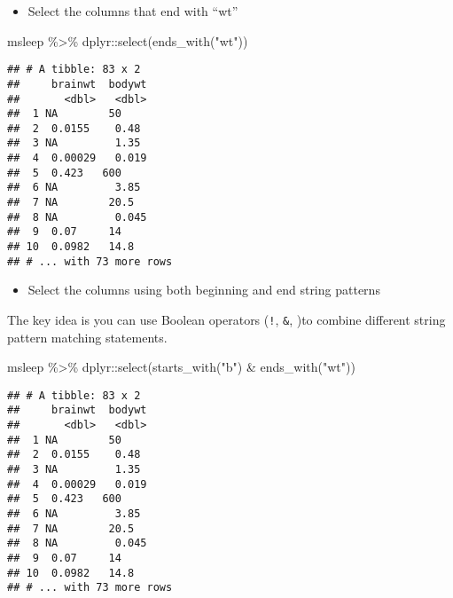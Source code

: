 \documentclass[
]{book}
\newenvironment{Shaded}{\begin{snugshade}}{\end{snugshade}}
\newcommand{\FunctionTok}[1]{\textcolor[rgb]{0.00,0.00,0.00}{#1}}
\newcommand{\NormalTok}[1]{#1}
\newcommand{\SpecialCharTok}[1]{\textcolor[rgb]{0.00,0.00,0.00}{#1}}
\newcommand{\StringTok}[1]{\textcolor[rgb]{0.31,0.60,0.02}{#1}}
\providecommand{\tightlist}{%
  \setlength{\itemsep}{0pt}\setlength{\parskip}{0pt}}
\begin{document}
\begin{itemize}
\tightlist
\item
  Select the columns that end with ``wt''
\end{itemize}

\begin{Shaded}
\begin{Highlighting}[]
\NormalTok{msleep }\SpecialCharTok{\%\textgreater{}\%}
\NormalTok{  dplyr}\SpecialCharTok{::}\FunctionTok{select}\NormalTok{(}\FunctionTok{ends\_with}\NormalTok{(}\StringTok{"wt"}\NormalTok{))}
\end{Highlighting}
\end{Shaded}

\begin{verbatim}
## # A tibble: 83 x 2
##     brainwt  bodywt
##       <dbl>   <dbl>
##  1 NA        50    
##  2  0.0155    0.48 
##  3 NA         1.35 
##  4  0.00029   0.019
##  5  0.423   600    
##  6 NA         3.85 
##  7 NA        20.5  
##  8 NA         0.045
##  9  0.07     14    
## 10  0.0982   14.8  
## # ... with 73 more rows
\end{verbatim}

\begin{itemize}
\tightlist
\item
  Select the columns using both beginning and end string patterns
\end{itemize}

The key idea is you can use Boolean operators (\texttt{!}, \texttt{\&}, \texttt{\textbar{}})to combine different string pattern matching statements.

\begin{Shaded}
\begin{Highlighting}[]
\NormalTok{msleep }\SpecialCharTok{\%\textgreater{}\%}
\NormalTok{  dplyr}\SpecialCharTok{::}\FunctionTok{select}\NormalTok{(}\FunctionTok{starts\_with}\NormalTok{(}\StringTok{"b"}\NormalTok{) }\SpecialCharTok{\&} \FunctionTok{ends\_with}\NormalTok{(}\StringTok{"wt"}\NormalTok{))}
\end{Highlighting}
\end{Shaded}

\begin{verbatim}
## # A tibble: 83 x 2
##     brainwt  bodywt
##       <dbl>   <dbl>
##  1 NA        50    
##  2  0.0155    0.48 
##  3 NA         1.35 
##  4  0.00029   0.019
##  5  0.423   600    
##  6 NA         3.85 
##  7 NA        20.5  
##  8 NA         0.045
##  9  0.07     14    
## 10  0.0982   14.8  
## # ... with 73 more rows
\end{verbatim}
\end{document}
